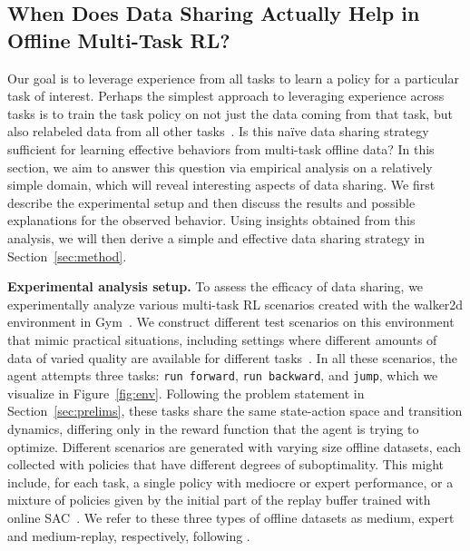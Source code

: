 

\subsection{When Does Data Sharing Actually Help in Offline Multi-Task RL?}
\label{sec:analysis}
\vspace{-0.1cm}

Our goal is to leverage experience from all tasks to learn a policy for a particular task of interest. Perhaps the simplest approach to leveraging experience across tasks is to train the task policy on not just the data coming from that task, but also relabeled data from all other tasks~\citep{caruana1997multitask}. Is this na\"ive data sharing strategy sufficient for learning effective behaviors from multi-task offline data? In this section, we aim to answer this question via empirical analysis on a relatively simple domain, which will reveal interesting aspects of data sharing. We first describe the experimental setup and then discuss the results and possible explanations for the observed behavior. Using insights obtained from this analysis, we will then derive a simple and effective data sharing strategy in Section~\ref{sec:method}.

\textbf{Experimental analysis setup.} To assess the efficacy of data sharing, we experimentally analyze various multi-task RL scenarios created with the walker2d environment in Gym~\citep{brockman2016openai}. We construct different test scenarios on this environment that mimic practical situations, including settings where different amounts of  data of varied quality are available for different tasks~\citep{kalashnikov2021mt,xie2019improvisation,singh2020parrot}. In all these scenarios, the agent attempts three tasks: \texttt{run forward}, \texttt{run backward}, and \texttt{jump}, which we visualize in Figure~\ref{fig:env}. Following the problem statement in Section~\ref{sec:prelims}, these tasks share the same state-action space and transition dynamics, differing only in the reward function that the agent is trying to optimize. 
Different scenarios are generated with varying size offline datasets, each collected with policies that have different degrees of suboptimality. This might include, for each task, a single policy with mediocre or expert performance, or a mixture of policies given by the initial part of the replay buffer trained with online SAC~\citep{haarnoja2018soft}. We refer to these three types of offline datasets as medium, expert and medium-replay, respectively, following \citet{fu2020d4rl}.

